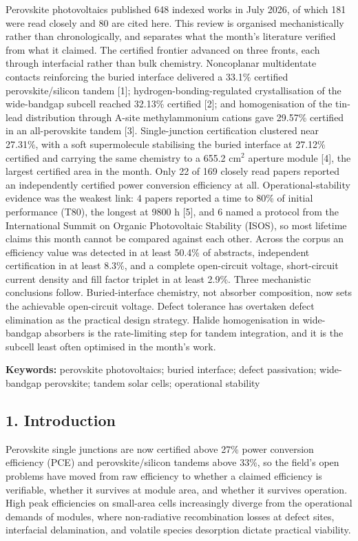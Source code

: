 \documentclass[
  11pt,
]{article}
\begin{document}
Perovskite photovoltaics published 648 indexed works in July 2026, of
which 181 were read closely and 80 are cited here. This review is
organised mechanistically rather than chronologically, and separates
what the month's literature verified from what it claimed. The certified
frontier advanced on three fronts, each through interfacial rather than
bulk chemistry. Noncoplanar multidentate contacts reinforcing the buried
interface delivered a 33.1\% certified perovskite/silicon tandem
{[}1{]}; hydrogen-bonding-regulated crystallisation of the wide-bandgap
subcell reached 32.13\% certified {[}2{]}; and homogenisation of the
tin-lead distribution through A-site methylammonium cations gave 29.57\%
certified in an all-perovskite tandem {[}3{]}. Single-junction
certification clustered near 27.31\%, with a soft supermolecule
stabilising the buried interface at 27.12\% certified and carrying the
same chemistry to a 655.2 cm\(^2\) aperture module {[}4{]}, the largest
certified area in the month. Only 22 of 169 closely read papers reported
an independently certified power conversion efficiency at all.
Operational-stability evidence was the weakest link: 4 papers reported a
time to 80\% of initial performance (T80), the longest at 9800 h
{[}5{]}, and 6 named a protocol from the International Summit on Organic
Photovoltaic Stability (ISOS), so most lifetime claims this month cannot
be compared against each other. Across the corpus an efficiency value
was detected in at least 50.4\% of abstracts, independent certification
in at least 8.3\%, and a complete open-circuit voltage, short-circuit
current density and fill factor triplet in at least 2.9\%. Three
mechanistic conclusions follow. Buried-interface chemistry, not absorber
composition, now sets the achievable open-circuit voltage. Defect
tolerance has overtaken defect elimination as the practical design
strategy. Halide homogenisation in wide-bandgap absorbers is the
rate-limiting step for tandem integration, and it is the subcell least
often optimised in the month's work.

\textbf{Keywords:} perovskite photovoltaics; buried interface; defect
passivation; wide-bandgap perovskite; tandem solar cells; operational
stability

\subsection{1. Introduction}\label{introduction}

Perovskite single junctions are now certified above 27\% power
conversion efficiency (PCE) and perovskite/silicon tandems above 33\%,
so the field's open problems have moved from raw efficiency to whether a
claimed efficiency is verifiable, whether it survives at module area,
and whether it survives operation. High peak efficiencies on small-area
cells increasingly diverge from the operational demands of modules,
where non-radiative recombination losses at defect sites, interfacial
delamination, and volatile species desorption dictate practical
viability.
\end{document}
